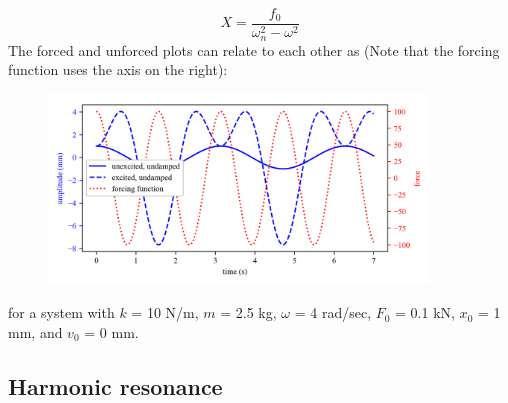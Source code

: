 \documentclass[12pt,letter]{article}
\numberwithin{ex}{section} %
\begin{document}
			\begin{equation}
				X = \frac{f_0}{\omega_n^2-\omega^2}
			\end{equation}				
			The forced and unforced plots can relate to each other as (Note that the forcing function uses the axis on the right):
			\begin{figure}[H]
				\centering
				\includegraphics[width=0.9\textwidth]{../Figures/forced_unforced_plot.png}
			\end{figure}	
			for a system with $k$ = 10 N/m, $m$ = 2.5 kg, $\omega$ = 4 rad/sec, $F_0$ = 0.1 kN, $x_0$ = 1 mm, and $v_0$ = 0 mm. 
			
			
		\subsection{Harmonic resonance}			
			
\end{document}
